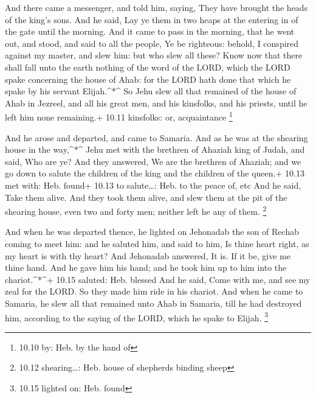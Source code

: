  And there came a messenger, and told him, saying, They have
brought the heads of the king's sons. And he said, Lay ye them in two
heaps at the entering in of the gate until the morning.  And
it came to pass in the morning, that he went out, and stood, and said to
all the people, Ye be righteous: behold, I conspired against my master,
and slew him: but who slew all these?  Know now that there
shall fall unto the earth nothing of the word of the LORD, which the
LORD spake concerning the house of Ahab: for the LORD hath done that
which he spake by his servant Elijah.\^{}*\^{}  So Jehu
slew all that remained of the house of Ahab in Jezreel, and all his
great men, and his kinsfolks, and his priests, until he left him none
remaining.+ 10.11 kinsfolks: or, acquaintance \footnote{10.10 by: Heb.
  by the hand of}

 And he arose and departed, and came to Samaria. And as he
was at the shearing house in the way,\^{}*\^{}  Jehu met
with the brethren of Ahaziah king of Judah, and said, Who are ye? And
they answered, We are the brethren of Ahaziah; and we go down to salute
the children of the king and the children of the queen.+ 10.13 met with:
Heb. found+ 10.13 to salute\ldots: Heb. to the peace of, etc
 And he said, Take them alive. And they took them alive,
and slew them at the pit of the shearing house, even two and forty men;
neither left he any of them. \footnote{10.12 shearing\ldots: Heb. house
  of shepherds binding sheep}

 And when he was departed thence, he lighted on Jehonadab
the son of Rechab coming to meet him: and he saluted him, and said to
him, Is thine heart right, as my heart is with thy heart? And Jehonadab
answered, It is. If it be, give me thine hand. And he gave him his hand;
and he took him up to him into the chariot.\^{}*\^{}+ 10.15 saluted:
Heb. blessed  And he said, Come with me, and see my zeal
for the LORD. So they made him ride in his chariot.  And
when he came to Samaria, he slew all that remained unto Ahab in Samaria,
till he had destroyed him, according to the saying of the LORD, which he
spake to Elijah. \footnote{10.15 lighted on: Heb. found}

